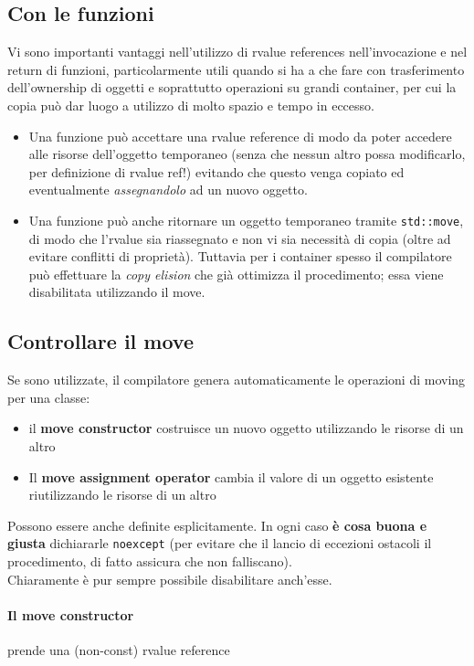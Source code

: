\documentclass[10pt, oneside]{book}
\begin{document}
\subsection{Con le funzioni}
Vi sono importanti vantaggi nell'utilizzo di rvalue references nell'invocazione e nel return di funzioni, particolarmente utili quando si ha a che fare con trasferimento dell'ownership di oggetti e soprattutto operazioni su grandi container, per cui la copia può dar luogo a utilizzo di molto spazio e tempo in eccesso.
\begin{itemize}
\item Una funzione può accettare una rvalue reference di modo da poter accedere alle risorse dell'oggetto temporaneo (senza che nessun altro possa modificarlo, per definizione di rvalue ref!) evitando che questo venga copiato ed eventualmente \textit{assegnandolo} ad un nuovo oggetto. 

\item Una funzione può anche ritornare un oggetto temporaneo tramite \texttt{std::move}, di modo che l'rvalue sia riassegnato e non vi sia necessità di copia (oltre ad evitare conflitti di proprietà). Tuttavia per i container spesso il compilatore può effettuare la \textit{copy elision} che già ottimizza il procedimento; essa viene disabilitata utilizzando il move.
\end{itemize}

\subsection{Controllare il move}
Se sono utilizzate, il compilatore genera automaticamente le operazioni di moving per una classe:
\begin{itemize}
\item il \textbf{move constructor} costruisce un nuovo oggetto utilizzando le risorse di un altro
\item Il \textbf{move assignment operator} cambia il valore di un oggetto esistente riutilizzando le risorse di un altro
\end{itemize}
Possono essere anche definite esplicitamente. In ogni caso \textbf{è cosa buona e giusta} dichiararle \texttt{noexcept} (per evitare che il lancio di eccezioni ostacoli il procedimento, di fatto assicura che non falliscano).\\
Chiaramente è pur sempre possibile disabilitare anch'esse.

\paragraph{Il move constructor} prende una (non-const) rvalue reference
\end{document}
